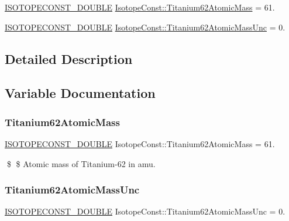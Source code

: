 \begin{DoxyCompactItemize}
\item 
\mbox{\hyperlink{group___isotope_const-_macros_ga8f45a7272ce02c0b4c65c44636ed719a}{I\+S\+O\+T\+O\+P\+E\+C\+O\+N\+S\+T\+\_\+\+D\+O\+U\+B\+LE}} \mbox{\hyperlink{group___isotope_const-_titanium-_ti62_ga51b3d24c565f54e2e0e693e97f9e3d0a}{Isotope\+Const\+::\+Titanium62\+Atomic\+Mass}} = 61.
\item 
\mbox{\hyperlink{group___isotope_const-_macros_ga8f45a7272ce02c0b4c65c44636ed719a}{I\+S\+O\+T\+O\+P\+E\+C\+O\+N\+S\+T\+\_\+\+D\+O\+U\+B\+LE}} \mbox{\hyperlink{group___isotope_const-_titanium-_ti62_ga5a461cd336fd5cf0233084f0c49b8d87}{Isotope\+Const\+::\+Titanium62\+Atomic\+Mass\+Unc}} = 0.
\end{DoxyCompactItemize}


\subsection{Detailed Description}


\subsection{Variable Documentation}
\mbox{\label{group___isotope_const-_titanium-_ti62_ga51b3d24c565f54e2e0e693e97f9e3d0a}} 
\subsubsection{\texorpdfstring{Titanium62\+Atomic\+Mass}{Titanium62AtomicMass}}
{\footnotesize\ttfamily \mbox{\hyperlink{group___isotope_const-_macros_ga8f45a7272ce02c0b4c65c44636ed719a}{I\+S\+O\+T\+O\+P\+E\+C\+O\+N\+S\+T\+\_\+\+D\+O\+U\+B\+LE}} Isotope\+Const\+::\+Titanium62\+Atomic\+Mass = 61.}

\$ \$ Atomic mass of Titanium-\/62 in amu. \mbox{\label{group___isotope_const-_titanium-_ti62_ga5a461cd336fd5cf0233084f0c49b8d87}} 
\subsubsection{\texorpdfstring{Titanium62\+Atomic\+Mass\+Unc}{Titanium62AtomicMassUnc}}
{\footnotesize\ttfamily \mbox{\hyperlink{group___isotope_const-_macros_ga8f45a7272ce02c0b4c65c44636ed719a}{I\+S\+O\+T\+O\+P\+E\+C\+O\+N\+S\+T\+\_\+\+D\+O\+U\+B\+LE}} Isotope\+Const\+::\+Titanium62\+Atomic\+Mass\+Unc = 0.}

